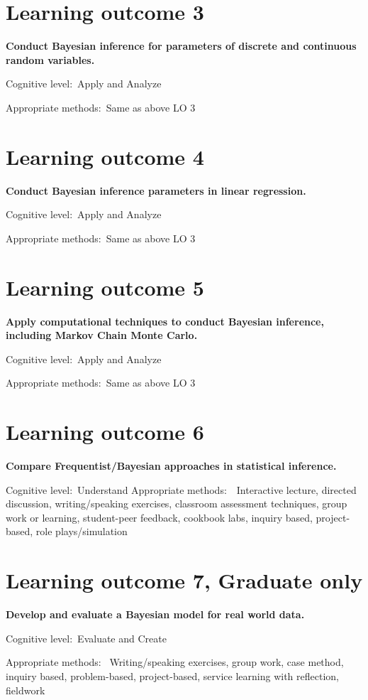 \documentclass[11pt,onecolumn]{article}
\begin{document}
\section{Learning outcome 3}
\textbf{Conduct Bayesian inference for parameters of discrete and continuous random variables.}

Cognitive level:~Apply and Analyze

Appropriate methods:~Same as above LO 3

\section{Learning outcome 4}
\textbf{Conduct Bayesian inference parameters in linear regression.}

Cognitive level:~Apply and Analyze

Appropriate methods:~Same as above LO 3

\section{Learning outcome 5}
\textbf{Apply computational techniques to conduct Bayesian inference, including Markov Chain Monte Carlo.}

Cognitive level:~Apply and Analyze

Appropriate methods:~Same as above LO 3

\section{Learning outcome 6}
\textbf{Compare Frequentist/Bayesian approaches in statistical inference.}

Cognitive level:~Understand
Appropriate methods:~~Interactive lecture, directed discussion, writing/speaking exercises, classroom assessment techniques, group work or learning, student-peer feedback, cookbook labs, inquiry based, project-based, role plays/simulation

\section{Learning outcome 7, Graduate only}
\textbf{Develop and evaluate a Bayesian model for real world data.}

Cognitive level:~Evaluate and Create

Appropriate methods:~ Writing/speaking exercises, group work, case method, inquiry based, problem-based, project-based, service learning with reflection, fieldwork
\end{document}

